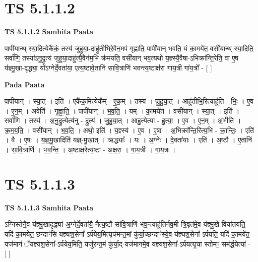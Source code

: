 \documentclass[17pt]{extarticle}
\begin{document}

\section{ TS 5.1.1.2 }

\textbf{TS 5.1.1.2 } \newline
\textbf{Samhita Paata} \newline

पापी॑यान्थ् स्या॒दित्येकै॑कं॒ तस्य॑ जुहुया॒-दाहु॑तीभिरे॒वैन॒मप॑ गृह्णाति॒ पापी॑यान् भवति॒ यं का॒मये॑त॒ वसी॑यान्थ् स्या॒दिति॒ सर्वा॑णि॒ तस्या॑ऽनु॒द्रुत्य॑ जुहुया॒दाहु॑त्यै॒वैन॑म॒भि क्र॑मयति॒ वसी॑यान् भव॒त्यथो॑ य॒ज्ञ्स्यै॒वैषा-ऽभिक्रा᳚न्ति॒रेति॒ वा ए॒ष य॑ज्ञ्मु॒खा-दृद्ध्या॒ यो᳚ऽग्नेर्दे॒वता॑या॒ एत्य॒ष्टावे॒तानि॑ सावि॒त्राणि॑ भवन्त्य॒ष्टाक्ष॑रा गाय॒त्री गा॑य॒त्रो᳚ - [  ] \newline

\textbf{Pada Paata} \newline

पापी॑यान् । स्या॒त् । इति॑ । एकै॑क॒मित्येक᳚म् - ए॒क॒म् । तस्य॑ । जु॒हु॒या॒त् । आहु॑तीभि॒रित्याहु॑ति - भिः॒ । ए॒व । ए॒न॒म् । अवेति॑ । गृ॒ह्णा॒ति॒ । पापी॑यान् । भ॒व॒ति॒ । यम् । का॒मये॑त । वसी॑यान् । स्या॒त् । इति॑ । सर्वा॑णि । तस्य॑ । अ॒नु॒द्रुत्येत्य॑नु - द्रुत्य॑ । जु॒हु॒या॒त् । आहु॒त्येत्या - हु॒त्या॒ । ए॒व । ए॒न॒म् । अ॒भीति॑ । क्र॒म॒य॒ति॒ । वसी॑यान् । भ॒व॒ति॒ । अथो॒ इति॑ । य॒ज्ञ्स्य॑ । ए॒व । ए॒षा । अ॒भिक्रा᳚न्ति॒रित्य॒भि -  क्रा॒न्तिः॒ । एति॑ । वै । ए॒षः । य॒ज्ञ्॒मु॒खादिति॑ यज्ञ्-मु॒खात् । ऋद्ध्याः᳚ । यः । अ॒ग्नेः । दे॒वता॑याः । एति॑ । अ॒ष्टौ । ए॒तानि॑ । सा॒वि॒त्राणि॑ । भ॒व॒न्ति॒ । अ॒ष्टाक्ष॒रेत्य॒ष्टा - अ॒क्ष॒रा॒ । गा॒य॒त्री । गा॒य॒त्रः ।  \newline





\section{ TS 5.1.1.3 }

\textbf{TS 5.1.1.3 } \newline
\textbf{Samhita Paata} \newline

ऽग्निस्तेनै॒व य॑ज्ञ्मु॒खादृद्ध्या॑ अ॒ग्नेर्दे॒वता॑यै॒ नैत्य॒ष्टौ सा॑वि॒त्राणि॑ भव॒न्त्याहु॑तिर्नव॒मी त्रि॒वृत॑मे॒व य॑ज्ञ्मु॒खे विया॑तयति॒ यदि॑ का॒मये॑त॒ छन्दाꣳ॑सि यज्ञ्यश॒सेना᳚ ऽर्पयेय॒मित्यृच॑मन्त॒मां कु॑र्या॒च्छन्दाꣳ॑स्ये॒व य॑ज्ञ्यश॒सेना᳚ ऽर्पयति॒ यदि॑ का॒मये॑त॒ यज॑मानं ॅयज्ञ्यश॒सेना᳚-ऽर्पयेय॒मिति॒ यजु॑रन्त॒मं कु॑र्या॒द्-यज॑मानमे॒व य॑ज्ञ्यश॒सेना᳚-ऽर्पयत्यृ॒चा स्तोमꣳ॒॒ सम॑र्द्ध॒येत्या॑ - [  ] \newline
\end{document}
